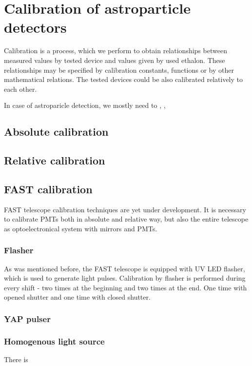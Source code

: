 
\chapter{Calibration of astroparticle detectors}
Calibration is a process, which we perform to obtain relationships between measured values by tested device and values given by used ethalon. These relationships may be specified by calibration constants, functions or by other mathematical relations. The tested devices could be also calibrated relatively to each other.
\par
In case of astroparicle detection, we mostly need to ,  , 
\section{Absolute calibration}


\section{Relative calibration}
\section{FAST calibration}
FAST telescope calibration techniques are yet under development. It is necessary to calibrate PMTs both in absolute and relative way, but also the entire telescope as optoelectronical system with mirrors and PMTs. 
\subsection{Flasher}
As was mentioned before, the FAST telescope is equipped with UV LED flasher, which is used to generate light pulses. Calibration by flasher is performed during every shift - two times at the beginning and two times at the end. One time with opened shutter and one time with closed shutter. 
\subsection{YAP pulser}



\subsection{Homogenous light source}
There is 







